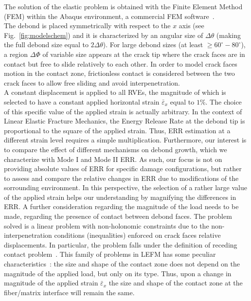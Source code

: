 \documentclass[smallextended]{svjour3}       %
\begin{document}
The solution of the elastic problem is obtained with the Finite Element Method (FEM) within the Abaqus environment, a commercial FEM software~\cite{abq12}.\\
The debond is placed symmetrically with respect to the $x$ axis (see Fig.~\ref{fig:modelschem}) and it is characterized by an angular size of $\Delta\theta$ (making the full debond size equal to $2\Delta\theta$). For large debond sizes (at least $\geq 60^{\circ}-80^{\circ}$), a region $\Delta\Phi$ of variable size appears at the crack tip where the crack faces are in contact but free to slide relatively to each other. In order to model crack faces motion in the contact zone, frictionless contact is considered between the two crack faces to allow free sliding and avoid interpenetration.\\
A constant displacement is applied to all RVEs, the magnitude of which is selected to have a constant applied horizontal strain $\bar{\varepsilon}_{x}$ equal to $1\%$. The choice of this specific value of the applied strain is actually arbitrary. In the context of Linear Elastic Fracture Mechanics, the Energy Release Rate at the debond tip is proportional to the square of the applied strain. Thus, ERR estimation at a different strain level requires a simple multiplication. Furthermore, our interest is to compare the effect of different mechanisms on debond growth, which we characterize with Mode I and Mode II ERR. As such, our focus is not on providing absolute values of ERR for specific damage configurations, but rather to assess and compare the relative changes in ERR due to modifications of the sorrounding environment. In this perspective, the selection of a rather large value of the applied strain helps our understanding by magnifying the differences in ERR. A further consideration regarding the magnitude of the load needs to be made, regarding the presence of contact between debond faces. The problem solved is a linear problem with non-holonomic constraints due to the non-interpenetration conditions (inequalities) enforced on crack faces relative displacements. In particular, the problem falls under the definition of receding contact problem~\cite{Paris1996,Garrido1991}. This family of problems in LEFM has some peculiar characteristics~\cite{Garrido1991,Keer1972,Tsai1974}: the size and shape of the contact zone does not depend on the magnitude of the applied load, but only on its type. Thus, upon a change in magnitude of the applied strain $\bar{\varepsilon}_{x}$ the size and shape of the contact zone at the fiber/matrix interface will remain the same.\\
\end{document}
